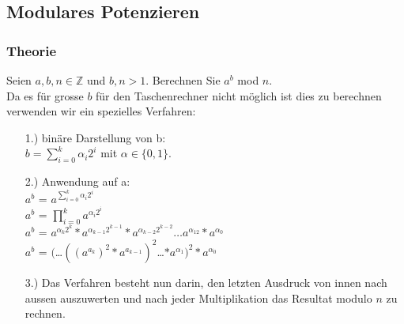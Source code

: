 \documentclass[landscape,twocolumn,a4paper]{article}
\newcommand{\ZN}{\mathbb{Z}} %
\begin{document}
\subsection{Modulares Potenzieren}
\subsubsection{Theorie}
Seien $a,b,n \in \ZN$ und $b,n > 1$. Berechnen Sie $a^b$ mod $n$. \\
Da es für grosse $b$ für den Taschenrechner nicht möglich ist dies zu berechnen verwenden wir ein spezielles Verfahren:
\begin{itemize}
	\item[1.)] binäre Darstellung von b: \\
		$b=\sum_{i=0}^k \alpha_i2^i$ mit $\alpha \in \{0,1\}$.
	\item[2.)] Anwendung auf a: \\
		$a^b$ = $a^{\sum_{i=0}^k \alpha_i2^i}$\\
		$a^b$ = $\prod_{i=0}^{k} a^{\alpha_i2^i}$ \\
		$a^b$ = $a^{\alpha_k2^k}*a^{\alpha_{k-1}2^{k-1}}*a^{\alpha_{k-2}2^{k-2}} \dots  a^{\alpha_12}*a^{\alpha_0}$ \\
		$a^b$ = $($\dots$((a^{a_k})^2*a^{a_{k-1}})^2$\dots$*a^{\alpha_1})^2*a^{\alpha_0}$
	\item[3.)] Das Verfahren besteht nun darin, den letzten Ausdruck von innen nach aussen auszuwerten und nach jeder Multiplikation das Resultat modulo $n$ zu rechnen.
\end{itemize}
\end{document}
